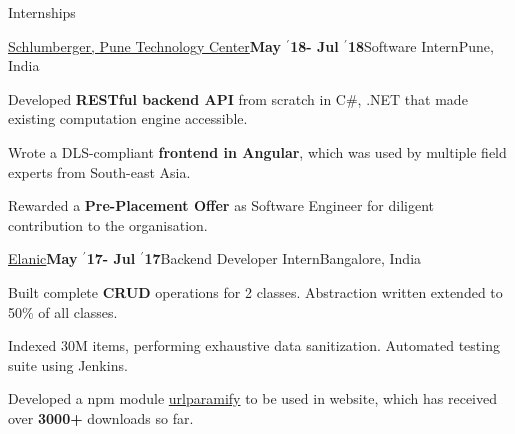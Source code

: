 \documentclass{resume} %
\begin{document}
\begin{rSection}{Internships}
\begin{rSubsection}{\large \href{https://drive.google.com/file/d/1EcfIC_g8bx3whaxMdOkFyZx4TCqA1RAq/view?usp=sharing}{Schlumberger, Pune Technology Center}}{\textbf{\large May $^{\prime}$18- Jul $^{\prime}$18}}{Software Intern}{Pune, India}
\item Developed {\bf RESTful backend API} from scratch in C\#, .NET that made existing computation engine accessible.
\item Wrote a DLS-compliant {\bf frontend in Angular}, which was used  by multiple field experts from South-east Asia.
\item Rewarded a {\bf Pre-Placement Offer} as Software Engineer for diligent contribution to the organisation.
\end{rSubsection}

\begin{rSubsection}{\large \href{https://drive.google.com/file/d/0B5iU6cWw36rOVWZIcllPY3RSd2c/view?usp=sharing}{Elanic}}{\textbf{\large May $^{\prime}$17- Jul $^{\prime}$17}}{Backend Developer Intern}{Bangalore, India}
\item Built complete \textbf{CRUD} operations for 2 classes. Abstraction written extended to 50\% of all classes.
\item Indexed 30M items, performing exhaustive data sanitization. Automated testing suite using Jenkins.
\item Developed a npm module \href{https://www.npmjs.com/package/urlparamify}{urlparamify} to be used in website, which has received over \textbf{3000+} downloads so far.
\end{rSubsection}


\end{rSection}



\end{document}
